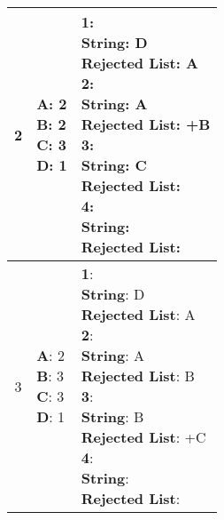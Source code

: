 \documentclass{article}
\begin{document}
\begin{center}
\begin{longtable}{ c|l|l }
        2 & \makecell{\textbf{A}: 2 \\ \textbf{B}: 2 \\ \textbf{C}: 3 \\ \textbf{D}: 1} &  
        \makecell{\textbf{1}:\\ \hspace{10mm} \textbf{String}: D \\ \hspace{10mm} \textbf{Rejected List}: A \\
                    \textbf{2}:\\ \hspace{10mm} \textbf{String}: A \\ \hspace{10mm} \textbf{Rejected List}: +B \\
                    \textbf{3}:\\ \hspace{10mm} \textbf{String}: C \\ \hspace{10mm} \textbf{Rejected List}: \\
                    \textbf{4}:\\ \hspace{10mm} \textbf{String}:  \\ \hspace{10mm} \textbf{Rejected List}: \\} \\
        \hline 

        3 & \makecell{\textbf{A}: 2 \\ \textbf{B}: 3 \\ \textbf{C}: 3 \\ \textbf{D}: 1} &  
        \makecell{\textbf{1}:\\ \hspace{10mm} \textbf{String}: D \\ \hspace{10mm} \textbf{Rejected List}: A \\
                    \textbf{2}:\\ \hspace{10mm} \textbf{String}: A \\ \hspace{10mm} \textbf{Rejected List}: B \\
                    \textbf{3}:\\ \hspace{10mm} \textbf{String}: B \\ \hspace{10mm} \textbf{Rejected List}: +C\\
                    \textbf{4}:\\ \hspace{10mm} \textbf{String}:  \\ \hspace{10mm} \textbf{Rejected List}: \\} \\
        \hline 


\end{longtable}
\end{center}
\end{document}
